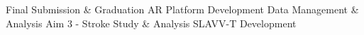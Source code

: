 {\begin{tabularx}{\linewidth}{|l!{\vrule width \myLenLineThicknessThick}*{7}{@{}X@{}|}}
       & 
    
      
      
       & 
    
      
      
       & 
    
      
      
       & 
    
      
      
       & 
    
      
      
       & 
    
      
      
      
        \\  \hline 
      
    
  
  
  \end{tabularx}
}
\vfill{\centering{} \small{Final Submission \& Graduation}\hspace{1.5em} \small{AR Platform Development}\hspace{1.5em} \small{Data Management \& Analysis}\hspace{1.5em} \small{Aim 3 - Stroke Study \& Analysis}\hspace{1.5em} \small{SLAVV-T Development}\hspace{1.5em}\par}

